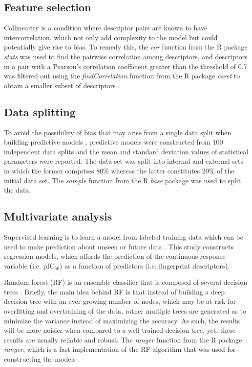 \documentclass[fleqn,10pt]{wlpeerj}
\begin{document}
\subsection*{Feature selection}

Collinearity is a condition where descriptor pairs are known to have intercorrelation, which not only add complexity to the model but could potentially give rise to bias. To remedy this, the \textit{cor} function from the R package \textit{stats} was used to find the pairwise correlation among descriptors, and descriptors in a pair with a Pearson's correlation coefficient greater than the threshold of 0.7 was filtered out using the \textit{findCorrelation} function from the R package \textit{caret} to obtain a smaller subset of descriptors \citep{kuhn2008building}. 

\subsection*{Data splitting}

To avoid the possibility of bias that may arise from a single data split when building predictive models \citep{puzyn2011investigating}, predictive models were constructed from 100 independent data splits and the mean and standard deviation values of statistical parameters were reported. The data set was split into internal and external sets in which the former comprises 80\% whereas the latter constitutes 20\% of the initial data set. The \textit{sample} function from the R \textit{base} package was used to split the data. 

\subsection*{Multivariate analysis}

Supervised learning is to learn a model from labeled training data which can be used to make prediction about unseen or future data \citep{james2013introduction}. This study constructs regression models, which affords the prediction of the continuous response variable (i.e. pIC$_{50}$) as a function of predictors (i.e. fingerprint descriptors). 

Random forest (RF) is an ensemble classifier that is composed of several decision trees \citep{breiman2001random}. Briefly, the main idea behind RF is that instead of building a deep decision tree with an ever-growing number of nodes, which may be at risk for overfitting and overtraining of the data, rather multiple trees are generated as to minimize the variance instead of maximizing the accuracy. As such, the results will be more noisier when compared to a well-trained decision tree, yet, these results are usually reliable and robust. The \textit{ranger} function from the R package \textit{ranger}, which is a fast implementation of the RF algorithm that was used for constructing the models \citep{wright2015ranger}.
\end{document}
